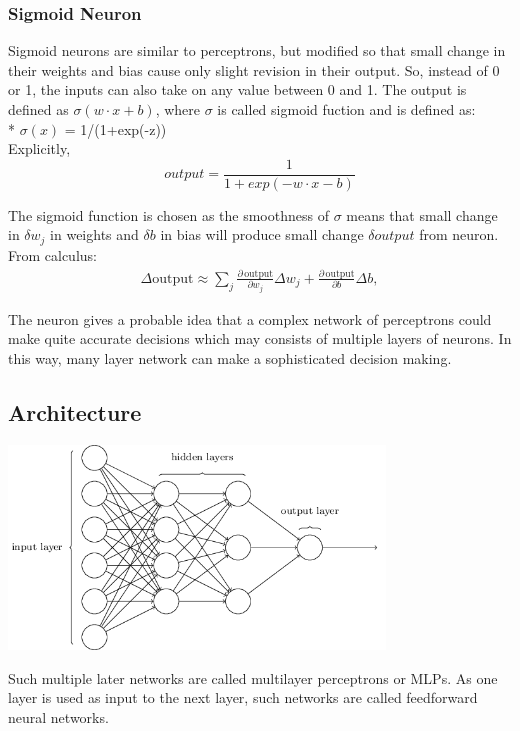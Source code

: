 \subsubsection{Sigmoid Neuron}

	Sigmoid neurons are similar to perceptrons, but modified so that small change in their weights and bias cause only slight revision in their output.
	So, instead of 0 or 1, the inputs can also take on any value between 0 and 1. The output is defined as $\sigma(w \cdot x + b)$, where $\sigma$ is called sigmoid fuction and is defined as:\\*
	$\sigma(x)$ = 1/(1+exp(-z))\\
	Explicitly,
	\begin{equation} 
	output = \frac{1}{1 + exp(- w \cdot x - b)}
	\end{equation}
	
	The sigmoid function is chosen as the smoothness of $\sigma$ means that small change in $\delta w_{j}$ in weights and $\delta b$ in bias will produce small change $\delta output$ from neuron.\\
	From calculus:\\
	\begin{eqnarray} 
	\Delta \mbox{output} \approx \sum_j \frac{\partial \, \mbox{output}}{\partial w_j}
	\Delta w_j + \frac{\partial \, \mbox{output}}{\partial b} \Delta b,
	\end{eqnarray}
	

	The neuron gives a probable idea that a complex network of perceptrons could make quite accurate decisions which may consists of multiple layers of neurons. In this way, many layer network can make a sophisticated decision making.
	

\subsection{Architecture}

	\begin{center}
		\includegraphics[width=0.75\textwidth]{architecture.png}
	\end{center}

Such multiple later networks are called multilayer perceptrons or MLPs.
As one layer is used as input to the next layer, such networks are called feedforward neural networks.